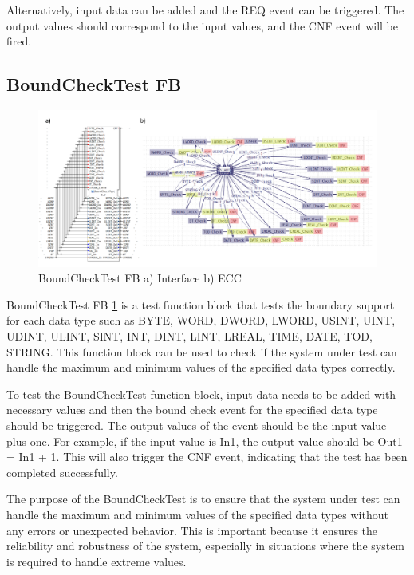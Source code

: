 \documentclass[conference]{IEEEtran}
\begin{document}
Alternatively, input data can be added and the REQ event can be triggered. The output values should correspond to the input values, and the CNF event will be fired.


\subsection{BoundCheckTest FB}

\begin{figure}[!t]
	\centering
	\includegraphics[width=1\textwidth]{Figures/BCT4Diac.PNG}
	\caption{BoundCheckTest FB a) Interface b) ECC}
	\label{fig:BCT4Diac}
\end{figure}


BoundCheckTest FB \ref{fig:BCT4Diac} is a test function block that tests the boundary support for each data type such as BYTE, WORD, DWORD, LWORD, USINT, UINT, UDINT, ULINT, SINT, INT, DINT, LINT, LREAL, TIME, DATE, TOD, STRING. This function block can be used to check if the system under test can handle the maximum and minimum values of the specified data types correctly.

To test the BoundCheckTest function block, input data needs to be added with necessary values and then the bound check event for the specified data type should be triggered. The output values of the event should be the input value plus one. For example, if the input value is In1, the output value should be Out1 = In1 + 1. This will also trigger the CNF event, indicating that the test has been completed successfully.

The purpose of the BoundCheckTest is to ensure that the system under test can handle the maximum and minimum values of the specified data types without any errors or unexpected behavior. This is important because it ensures the reliability and robustness of the system, especially in situations where the system is required to handle extreme values.
\end{document}
